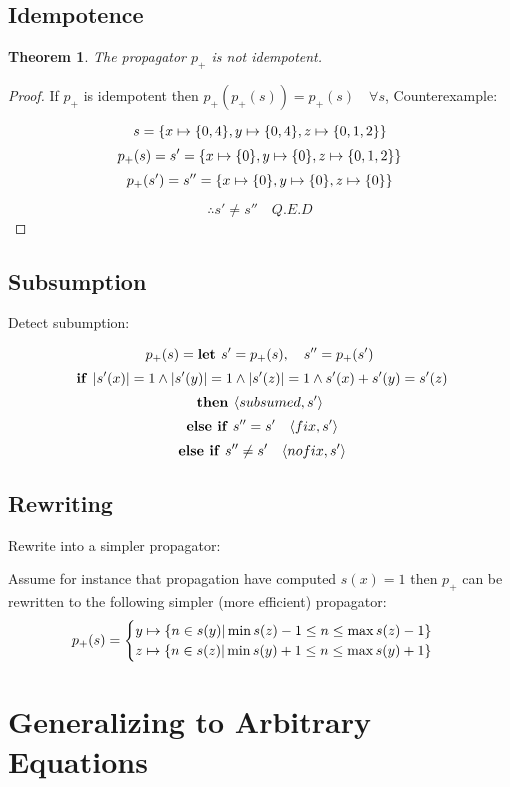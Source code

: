 \documentclass[a4paper, 11pt]{article}
\newtheorem{theorem}{Theorem}[section]
\newcommand\mymapsto{\mathrel{\ooalign{$\rightarrow$\cr%
  \kern-.15ex\raise.275ex\hbox{\scalebox{1}[0.522]{$\mid$}}\cr}}}
\begin{document}
\subsection*{Idempotence}
\begin{theorem}
The propagator $p_+$ is not idempotent.
\end{theorem}
\begin{proof}
If $p_+$ is idempotent then $p_+(p_+(s)) = p_+(s) \quad \forall s$, 
Counterexample:

$$s = \{x \mymapsto \{0,4\}, y \mymapsto \{0,4\}, z \mymapsto \{0,1,2\}\}$$
$$p_+(s) = s' = \{x \mymapsto \{0\}, y \mymapsto \{0\}, z \mymapsto \{0,1,2\}\}$$
$$p_+(s') = s'' = \{x \mymapsto \{0\}, y \mymapsto \{0\}, z \mymapsto \{0\}\}$$

$$\therefore s' \neq s'' \quad Q.E.D$$

\end{proof}
\subsection*{Subsumption}
Detect subumption:

$$p_+(s) = \text{\textbf{let }} s' = p_+(s),\quad s'' = p_+(s')$$
$$\text{ \textbf{if }} |s'(x)| = 1 \land |s'(y)| = 1 \land |s'(z)| = 1 \land s'(x) + s'(y) = s'(z)$$
$$\text{\textbf{then }} \langle subsumed, s'\rangle$$
$$\text{ \textbf{else if} } s'' = s' \quad \langle fix, s' \rangle$$
$$\text{ \textbf{else if} } s'' \neq s' \quad \langle nofix, s' \rangle$$

\subsection*{Rewriting}
Rewrite into a simpler propagator:

Assume for instance that propagation have computed $s(x) = {1}$ then $p_+$ can be rewritten to the following simpler (more efficient) propagator:
\begin{gather*}
p_+(s) = 
\begin{cases}
  y \mymapsto \{n \in s(y) | \min s(z) - 1 \leq n \leq \max s(z) - 1 \}\\
  z \mymapsto \{n \in s(z) | \min s(y) + 1 \leq n \leq \max s(y) + 1 \}\\    
\end{cases}
\end{gather*}

\section*{Generalizing to Arbitrary Equations}
\end{document}
